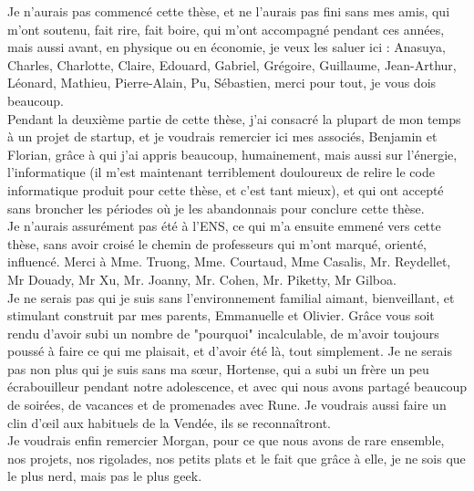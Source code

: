 Je n'aurais pas commencé cette thèse, et ne l'aurais pas fini sans mes amis, qui m'ont soutenu, fait rire, fait boire, qui m'ont accompagné pendant ces années, mais aussi avant, en physique ou en économie, je veux les saluer ici : Anasuya, Charles, Charlotte, Claire, Edouard, Gabriel, Grégoire, Guillaume, Jean-Arthur, Léonard, Mathieu, Pierre-Alain, Pu, Sébastien, merci pour tout, je vous dois beaucoup. \\

Pendant la deuxième partie de cette thèse, j'ai consacré la plupart de mon temps à un projet de startup, et je voudrais remercier ici mes associés, Benjamin et Florian, grâce à qui j'ai appris beaucoup, humainement, mais aussi sur l'énergie, l'informatique (il m'est maintenant terriblement douloureux de relire le code informatique produit pour cette thèse, et c'est tant mieux), et qui ont accepté sans broncher les périodes où je les abandonnais pour conclure cette thèse.\\

Je n'aurais assurément pas été à l'ENS, ce qui m'a ensuite emmené vers cette thèse, sans avoir croisé le chemin de professeurs qui m'ont marqué, orienté, influencé. Merci à Mme. Truong, Mme. Courtaud, Mme Casalis, Mr. Reydellet, Mr Douady, Mr Xu, Mr. Joanny, Mr. Cohen, Mr. Piketty, Mr Gilboa.\\

Je ne serais pas qui je suis sans l'environnement familial aimant, bienveillant, et stimulant construit par mes parents, Emmanuelle et Olivier. Grâce vous soit rendu d'avoir subi un nombre de "pourquoi" incalculable, de m'avoir toujours poussé à faire ce qui me plaisait, et d'avoir été là, tout simplement. Je ne serais pas non plus qui je suis sans ma s\oe{}ur, Hortense, qui a subi un frère un peu écrabouilleur pendant notre adolescence, et avec qui nous avons partagé beaucoup de soirées, de vacances et de promenades avec Rune. Je voudrais aussi faire un clin d'\oe{}il aux habituels de la Vendée, ils se reconnaîtront.\\

Je voudrais enfin remercier Morgan, pour ce que nous avons de rare ensemble, nos projets, nos rigolades, nos petits plats et le fait que grâce à elle, je ne sois que le plus nerd, mais pas le plus geek. \\
